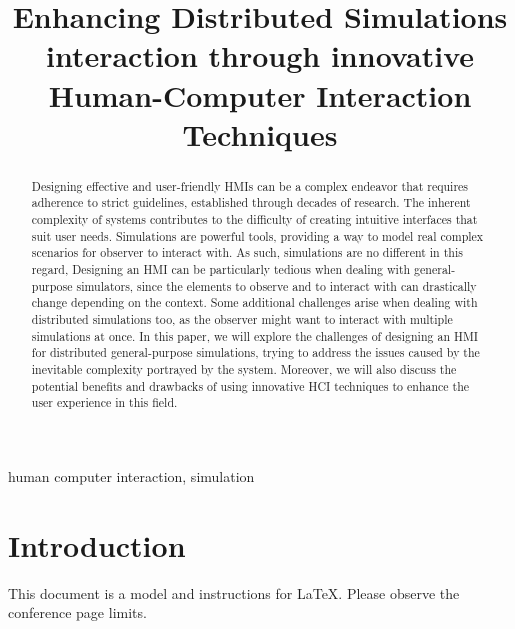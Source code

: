 \documentclass[conference]{IEEEtran}
\begin{document}
\usepackage{myacronyms}

\title{Enhancing Distributed Simulations interaction through innovative Human-Computer Interaction Techniques\\
}

\author{
}

\maketitle

\begin{abstract}
    Designing effective and user-friendly \acp{HMI} can be a complex endeavor that requires adherence to strict guidelines,
    established through decades of research.
    The inherent complexity of systems contributes to the difficulty of creating intuitive interfaces that suit user needs.
    Simulations are powerful tools,
    providing a way to model real complex scenarios for observer to interact with.
    As such,
    simulations are no different in this regard,
    Designing an \ac{HMI} can be particularly tedious when dealing with general-purpose simulators,
    since the elements to observe and to interact with can drastically change depending on the context.
    Some additional challenges arise when dealing with distributed simulations too,
    as the observer might want to interact with multiple simulations at once.
    In this paper,
    we will explore the challenges of designing an \ac{HMI} for distributed general-purpose simulations,
    trying to address the issues caused by the inevitable complexity portrayed by the system.
    Moreover,
    we will also discuss the potential benefits and drawbacks of using innovative \ac{HCI} techniques to enhance the user experience in this field.
\end{abstract}

\begin{IEEEkeywords}
    human computer interaction, simulation
\end{IEEEkeywords}

\section{Introduction}
This document is a model and instructions for \LaTeX.
Please observe the conference page limits. 
\end{document}

